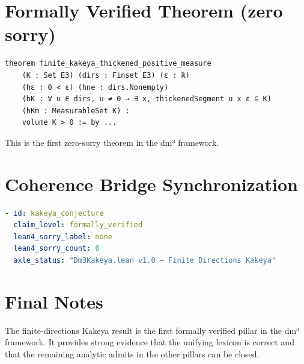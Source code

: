\documentclass[11pt,a4paper]{article}
\begin{document}
\section{Formally Verified Theorem (zero sorry)}

\begin{lstlisting}
theorem finite_kakeya_thickened_positive_measure
    (K : Set E3) (dirs : Finset E3) (ε : ℝ)
    (hε : 0 < ε) (hne : dirs.Nonempty)
    (hK : ∀ u ∈ dirs, u ≠ 0 → ∃ x, thickenedSegment u x ε ⊆ K)
    (hKm : MeasurableSet K) :
    volume K > 0 := by ...
\end{lstlisting}

This is the first zero-sorry theorem in the dm³ framework.

\section{Coherence Bridge Synchronization}

\begin{lstlisting}[language=YAML]
- id: kakeya_conjecture
  claim_level: formally_verified
  lean4_sorry_label: none
  lean4_sorry_count: 0
  axle_status: "Dm3Kakeya.lean v1.0 — Finite Directions Kakeya"
\end{lstlisting}

\section{Final Notes}

The finite-directions Kakeya result is the first formally verified pillar in the dm³ framework.
It provides strong evidence that the unifying lexicon is correct and that the remaining analytic admits in the other pillars can be closed.
\end{document}

